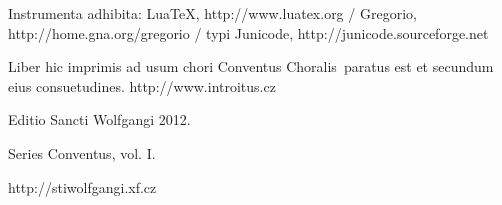 \documentclass[a4paper, twoside, 12pt]{article}
\begin{document}
Instrumenta adhibita: 
LuaTeX, http://www.luatex.org / 
Gregorio, http://home.gna.org/gregorio /
typi Junicode, http://junicode.sourceforge.net

\begin{center}
Liber hic imprimis ad usum chori 
\guillemotright Conventus Choralis\guillemotleft\ 
paratus est
et secundum eius consuetudines.
http://www.introitus.cz

\vspace{1cm}

{\large Editio Sancti Wolfgangi 2012.}

\vspace{2mm}

Series \guillemotright Conventus\guillemotleft, vol. I.

\vspace{1cm}

http://stiwolfgangi.xf.cz

\end{center}

\vfill
\end{document}

